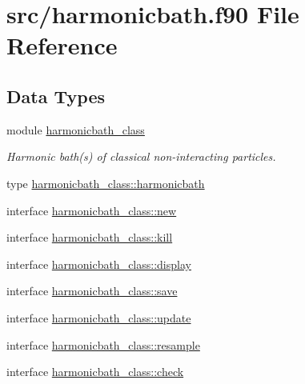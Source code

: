 \hypertarget{harmonicbath_8f90}{\section{src/harmonicbath.f90 File Reference}
\label{harmonicbath_8f90}
}
\subsection*{Data Types}
\begin{DoxyCompactItemize}
\item 
module \hyperlink{classharmonicbath__class}{harmonicbath\-\_\-class}
\begin{DoxyCompactList}\small\item\em Harmonic bath(s) of classical non-\/interacting particles. \end{DoxyCompactList}\item 
type \hyperlink{structharmonicbath__class_1_1harmonicbath}{harmonicbath\-\_\-class\-::harmonicbath}
\item 
interface \hyperlink{interfaceharmonicbath__class_1_1new}{harmonicbath\-\_\-class\-::new}
\item 
interface \hyperlink{interfaceharmonicbath__class_1_1kill}{harmonicbath\-\_\-class\-::kill}
\item 
interface \hyperlink{interfaceharmonicbath__class_1_1display}{harmonicbath\-\_\-class\-::display}
\item 
interface \hyperlink{interfaceharmonicbath__class_1_1save}{harmonicbath\-\_\-class\-::save}
\item 
interface \hyperlink{interfaceharmonicbath__class_1_1update}{harmonicbath\-\_\-class\-::update}
\item 
interface \hyperlink{interfaceharmonicbath__class_1_1resample}{harmonicbath\-\_\-class\-::resample}
\item 
interface \hyperlink{interfaceharmonicbath__class_1_1check}{harmonicbath\-\_\-class\-::check}
\end{DoxyCompactItemize}
